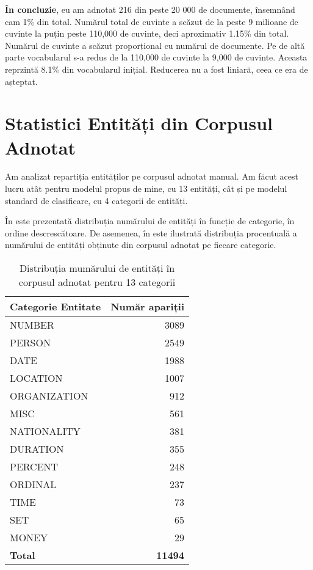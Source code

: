 \textbf{În concluzie}, eu am adnotat 216 din peste 20 000 de documente, însemnând cam 1\% din total. Numărul total de cuvinte a scăzut de la peste 9 milioane de cuvinte la puțin peste 110,000 de cuvinte, deci aproximativ 1.15\% din total. Numărul de cuvinte a scăzut proporțional cu numărul de documente. Pe de altă parte vocabularul s-a redus de la 110,000 de cuvinte la 9,000 de cuvinte. Aceasta reprzintă 8.1\% din vocabularul inițial. Reducerea nu a fost liniară, ceea ce era de așteptat.

\section{Statistici Entități din Corpusul Adnotat}

Am analizat repartiția entităților pe corpusul adnotat manual. Am făcut acest lucru atât pentru modelul propus de mine, cu 13 entități, cât și pe modelul standard de clasificare, cu 4 categorii de entități.

În  este prezentată distribuția numărului de entități în funcție de categorie, în ordine descrescătoare. De asemenea, în  este ilustrată distribuția procentuală a numărului de entități obținute din corpusul adnotat pe fiecare categorie.

\begin{center}
\begin{table}[htb]
  \caption{Distribuția mumărului de entități în corpusul adnotat pentru 13 categorii}
  \begin{tabular}{|l|r|}
  \hline
   Categorie Entitate & Număr apariții\\
   \hline
   
 NUMBER	&	3089	\\
 PERSON	&	2549	\\
 DATE	&	1988	\\
 LOCATION	&	1007	\\
 ORGANIZATION	&	912	\\
 MISC	&	561	\\
 NATIONALITY	&	381	\\
 DURATION	&	355	\\
 PERCENT	&	248	\\
 ORDINAL	&	237	\\
 TIME	&	73	\\
 SET	&	65	\\
 MONEY	&	29	\\
  
   \hline
   \textbf{Total} 	&	\textbf{11494} \\
   \hline
   
  \end{tabular}
  \label{table:top-entites-13-categories}
\end{table}
\end{center}

